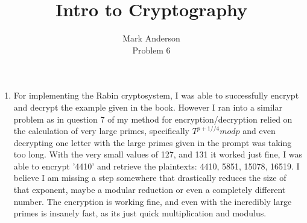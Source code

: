 \documentclass[12pt]{article}
\begin{document}
 
\title{Intro to Cryptography} 
\author{Mark Anderson\\ 
Problem 6} 
 
\maketitle
\begin{enumerate}
  \item For implementing the Rabin cryptosystem, I was able to successfully encrypt and decrypt the example given in the book.  However I ran into a similar problem as in question 7 of my method for encryption/decryption relied on the calculation of very large primes, specifically $T^{p+1 // 4} mod p$ and even decrypting one letter with the large primes given in the prompt was taking too long.  With the very small values of 127, and 131 it worked just fine, I was able to encrypt '4410' and retrieve the plaintexts: 4410, 5851, 15078, 16519.  I believe I am missing a step somewhere that drastically reduces the size of that exponent, maybe a modular reduction or even a completely different number.  The encryption is working fine, and even with the incredibly large primes is insanely fast, as its just quick multiplication and modulus.
\end{enumerate}
\end{document}
